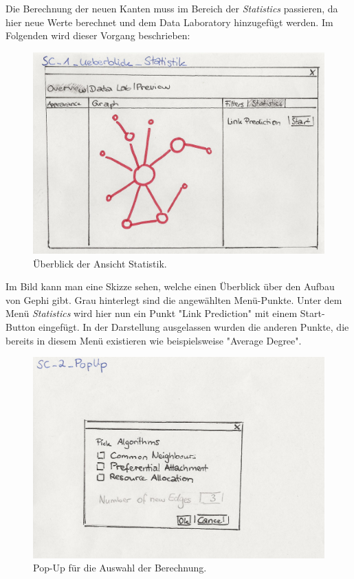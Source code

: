 Die Berechnung der neuen Kanten muss im Bereich der \textit{Statistics} passieren, da hier neue Werte berechnet und dem
Data Laboratory hinzugefügt werden. Im Folgenden wird dieser Vorgang beschrieben:

\begin{figure}[htbp]
    \includegraphics[width=\linewidth]{resources/SC-1.png}
    \caption{Überblick der Ansicht Statistik.}
    \label{fig:screen1}
\end{figure}

Im Bild kann man eine Skizze sehen, welche einen Überblick über den Aufbau von Gephi gibt. Grau hinterlegt sind die
angewählten Menü-Punkte. Unter dem Menü \textit{Statistics} wird hier nun ein Punkt "Link Prediction" mit einem
Start-Button eingefügt. In der Darstellung ausgelassen wurden die anderen Punkte, die bereits in diesem Menü existieren
wie beispielsweise "Average Degree".

\begin{figure}[htbp]
    \includegraphics[width=\linewidth]{resources/SC-2.png}
    \caption{Pop-Up für die Auswahl der Berechnung.}
    \label{fig:screen2}
\end{figure}

